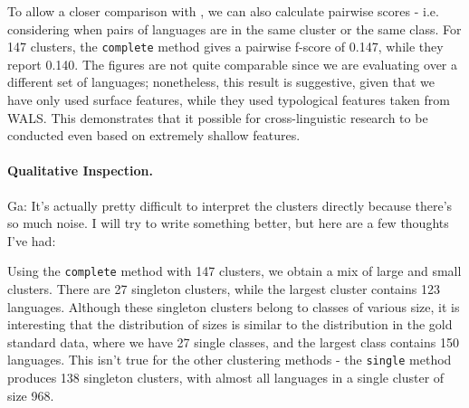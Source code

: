 To allow a closer comparison with , we can also calculate pairwise scores - i.e. considering when pairs of languages are in the same cluster or the same class. For 147 clusters, the \texttt{complete} method gives a pairwise f-score of 0.147, while they report 0.140. The figures are not quite comparable since we are evaluating over a different set of languages; nonetheless, this result is suggestive, given that we have only used surface features, while they used typological features taken from WALS.  This demonstrates that it possible for cross-linguistic research to be conducted even based on extremely shallow features.





\paragraph{Qualitative Inspection.}
Ga: It's actually pretty difficult to interpret the clusters directly because there's so much noise. I will try to write something better, but here are a few thoughts I've had:

Using the \texttt{complete} method with 147 clusters, we obtain a mix of large and small clusters. There are 27 singleton clusters, while the largest cluster contains 123 languages. Although these singleton clusters belong to classes of various size, it is interesting that the distribution of sizes is similar to the distribution in the gold standard data, where we have 27 single classes, and the largest class contains 150 languages.  This isn't true for the other clustering methods - the \texttt{single} method produces 138 singleton clusters, with almost all languages in a single cluster of size 968.
